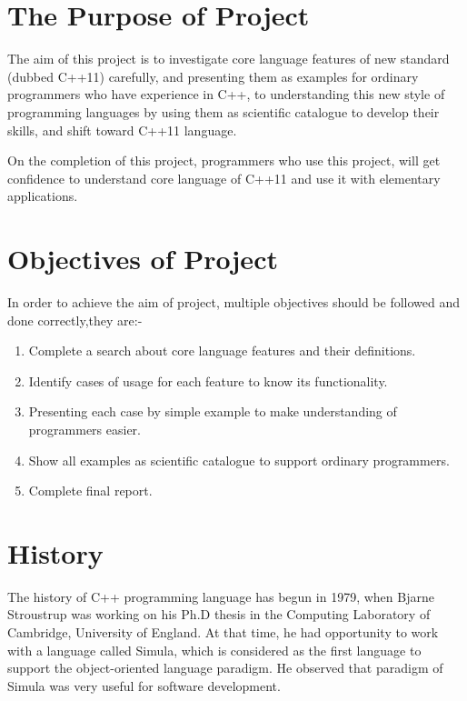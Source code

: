 \documentclass[11pt,]{report}
\begin{document}
\section{The Purpose of Project}
\label{section:The purpose of project}
The aim of this project is to investigate core language  features of new \linebreak standard (dubbed C++11) carefully, and presenting them as examples for \linebreak ordinary programmers who have experience in C++, to understanding this new style of programming languages by using them as scientific  catalogue to develop their skills, and shift toward C++11 language.

On the completion of this project, programmers who use this project, will get confidence to understand core language of  C++11 and use it with \linebreak elementary applications.

\section{Objectives of Project}
\label{section:objectives of project}
In order to achieve the aim of project, multiple objectives should be followed and done correctly,they are:-
 \begin{enumerate}
   \item Complete a search about core language features and their definitions.
   \item Identify cases of usage for each feature  to know its functionality.
   \item Presenting each case by simple example to make understanding of \linebreak programmers easier.
   \item Show all examples as scientific catalogue to support ordinary \linebreak programmers.
   \item Complete final report.
 \end{enumerate}       
 
  
\section{History}
\label{section: History}
The history of C++ programming language has begun in 1979, when Bjarne Stroustrup was working on his Ph.D thesis in the Computing Laboratory of Cambridge, University of England. At that time, he had opportunity to work with a language called Simula, which is considered as the first language to support the object-oriented language paradigm. He observed that paradigm of Simula was very useful for software development\cite{StroustrupHistory}.
\end{document}
